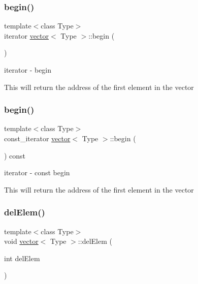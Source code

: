 \subsubsection{\texorpdfstring{begin()}{begin()}\hspace{0.1cm}{\footnotesize\ttfamily [1/2]}}
{\footnotesize\ttfamily template$<$class Type$>$ \\
iterator \hyperlink{classvector}{vector}$<$ Type $>$\+::begin (\begin{DoxyParamCaption}{ }\end{DoxyParamCaption})\hspace{0.3cm}{\ttfamily [inline]}}



iterator -\/ begin 

This will return the address of the first element in the vector \hypertarget{classvector_a4e799b72c6f027170e5ae7145746abf1}{}\label{classvector_a4e799b72c6f027170e5ae7145746abf1} 
\subsubsection{\texorpdfstring{begin()}{begin()}\hspace{0.1cm}{\footnotesize\ttfamily [2/2]}}
{\footnotesize\ttfamily template$<$class Type$>$ \\
const\+\_\+iterator \hyperlink{classvector}{vector}$<$ Type $>$\+::begin (\begin{DoxyParamCaption}{ }\end{DoxyParamCaption}) const\hspace{0.3cm}{\ttfamily [inline]}}



iterator -\/ const begin 

This will return the address of the first element in the vector \hypertarget{classvector_a427b0c894a09dd7d57f46b341fad95a5}{}\label{classvector_a427b0c894a09dd7d57f46b341fad95a5} 
\subsubsection{\texorpdfstring{del\+Elem()}{delElem()}}
{\footnotesize\ttfamily template$<$class Type$>$ \\
void \hyperlink{classvector}{vector}$<$ Type $>$\+::del\+Elem (\begin{DoxyParamCaption}\item[{int}]{del\+Elem }\end{DoxyParamCaption})\hspace{0.3cm}{\ttfamily [inline]}}



